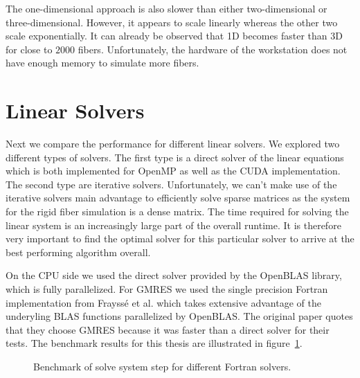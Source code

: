 \documentclass[a4paper,11pt]{kth-mag}
\begin{document}
The one-dimensional approach is also slower than either two-dimensional or three-dimensional. However, it appears to scale linearly whereas the other two scale exponentially. It can already be observed that 1D becomes faster than 3D for close to $2000$ fibers. Unfortunately, the hardware of the workstation does not have enough memory to simulate more fibers.

\section{Linear Solvers}

Next we compare the performance for different linear solvers. We explored two different types of solvers. The first type is a direct solver of the linear equations which is both implemented for OpenMP as well as the CUDA implementation. The second type are iterative solvers. Unfortunately, we can't make use of the iterative solvers main advantage to efficiently solve sparse matrices as the system for the rigid fiber simulation is a dense matrix. The time required for solving the linear system is an increasingly large part of the overall runtime. It is therefore very important to find the optimal solver for this particular solver to arrive at the best performing algorithm overall.

On the CPU side we used the direct solver provided by the OpenBLAS library, which is fully parallelized. For GMRES we used the single precision Fortran implementation from Frayssé et al. which takes extensive advantage of the underyling BLAS functions parallelized by OpenBLAS. The original paper quotes that they choose GMRES because it was faster than a direct solver for their tests. The benchmark results for this thesis are illustrated in figure~\ref{fig:bench_openmp_solvers}.

\begin{figure}
  \centering
  \caption{Benchmark of solve system step for different Fortran solvers.}
  \label{fig:bench_openmp_solvers}
\end{figure}
\end{document}
